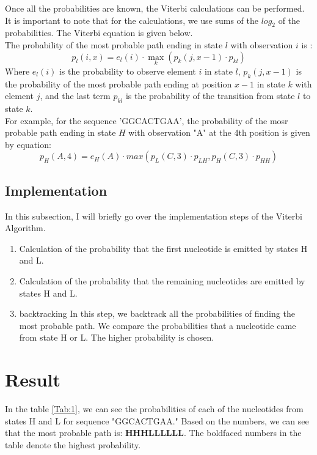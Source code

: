 \documentclass{article}
\begin{document}
Once all the probabilities are known, the Viterbi calculations can be performed. It is important to note that for the calculations, we use sums of the $log_2$ of the probabilities. The Viterbi equation is given below.\\

The probability of the most probable path ending in state $l$ with observation $i$ is :
\begin{equation}
	p_l(i,x) = e_l(i) \cdot \displaystyle\max_k(p_k(j,x-1) \cdot p_{kl})
\end{equation}
Where $e_l(i)$ is the probability to observe element $i$ in state $l$, $p_k(j,x-1)$ is the probability of the most probable path ending at position $x-1$ in state $k$ with element $j$, and the last term $p_{kl}$ is the probability of the transition from state $l$ to state $k$.\\

For example, for the sequence 'GGCACTGAA', the probability of the mosr probable path ending in state $H$ with observation "A" at the 4th position is given by equation:
\begin{equation}
	p_H(A,4) = e_H(A) \cdot max(p_L(C,3) \cdot p_{LH}, p_H(C,3) \cdot p_{HH} )
\end{equation}

\subsection{Implementation}\label{sec:Imp}
In this subsection, I will briefly go over the implementation steps of the Viterbi Algorithm.
\begin{enumerate}
\item Calculation of the probability that the first nucleotide is emitted by states H and L.
\item Calculation of the probability that the remaining nucleotides are emitted by states H and L.
\item backtracking
In this step, we backtrack all the probabilities of finding the most probable path. We compare the probabilities that a nucleotide came from state H or L. The higher probability is chosen.
\end{enumerate}

\section{Result}\label{sec:res}
In the table \ref{Tab:1}, we can see the probabilities of each of the nucleotides from states H and L for sequence "GGCACTGAA." Based on the numbers, we can see that the most probable path is: \textbf {HHHLLLLLL}.
The boldfaced numbers in the table denote the highest probability.\\
\end{document}
